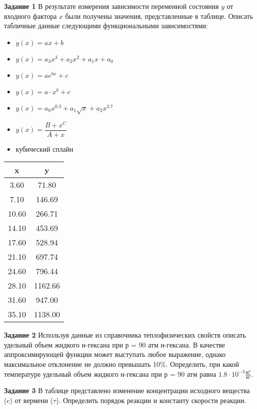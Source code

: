 \textbf{Задание 1} В результате измерения зависимости переменной состояния $y$ от входного фактора $x$ были получены значения, представленные в таблице. Описать табличные данные следующими функциональными зависимостями:
 \begin{itemize} 
\item $y(x)=a x+b$
\item $y(x)=a_3 x^3 +a_2 x^2 + a_1 x +a_0$
\item $y(x)=a e^{b x}+c  $
\item $y(x)=a \cdot x^b+c$
\item $y(x)=a_0 x^{0.3}               +a_1 \sqrt{x}               +a_2 x^{3.7}               $
\item $y(x)=\dfrac{B+x^C}{A+x}                 $
\item кубический сплайн        
\end{itemize}
\begin{table}[h]
\begin{tabular}{|c|c|}
\hline
x & y \\ \hline
 3.60 &      71.80 \\ \hline 
 7.10 &     146.69 \\ \hline 
10.60 &     266.71 \\ \hline 
14.10 &     453.69 \\ \hline 
17.60 &     528.94 \\ \hline 
21.10 &     697.74 \\ \hline 
24.60 &     796.44 \\ \hline 
28.10 &    1162.66 \\ \hline 
31.60 &     947.00 \\ \hline 
35.10 &    1138.00 \\ \hline 
\end{tabular}
\end{table}

\textbf{Задание 2}  Используя данные из справочника теплофизических свойств описать удельный объем жидкого н-гексана при р = 90 атм н-гексана. В качестве аппроксимирующей функции может выступать любое выражение, однако максимальное отклонение не должно превышать 10\%. Определить, при какой температуре удельный объем жидкого н-гексана при р = 90 атм равна $     1.8 \cdot 10^{-3} \frac{\text{м}^3}{ \text{кг}}$.

\textbf{Задание 3} В таблице представлено изменение концентрации исходного вещества (c) от вермени ($\tau$). Определить порядок реакции и константу скорости реакции.

